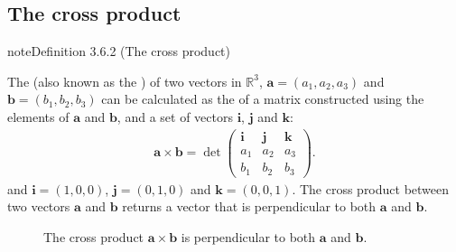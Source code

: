 \documentclass[letterpaper,10pt,english]{jupyterBook}
\let\sphinxpxdimen\pdfpxdimen\else\newdimen\sphinxpxdimen
\begin{document}
\subsection{The cross product}
\label{\detokenize{_pages/3.3_Dot_and_cross_products:the-cross-product}}\label{\detokenize{_pages/3.3_Dot_and_cross_products:index-3}}\label{\detokenize{_pages/3.3_Dot_and_cross_products:index-2}}\label{\detokenize{_pages/3.3_Dot_and_cross_products:cross-product-section}}\label{_pages/3.3_Dot_and_cross_products:cross-product-definition}
\begin{sphinxadmonition}{note}{Definition 3.6.2 (The cross product)}



\sphinxAtStartPar
The  (also known as the ) of two vectors in \(\mathbb{R}^3\), \(\mathbf{a}=(a_1,a_2,a_3)\) and \(\mathbf{b}=(b_1,b_2,b_3)\) can be calculated as the {\hyperref[\detokenize{_pages/1.4_Determinants:determinant-section}]{}} of a matrix constructed using the elements of \(\mathbf{a}\) and \(\mathbf{b}\), and a set of vectors \(\mathbf{i}\), \(\mathbf{j}\) and \(\mathbf{k}\):
\begin{equation}\label{equation:_pages/3.3_Dot_and_cross_products:cross-product-equation}
\begin{split}\mathbf{a} \times \mathbf{b} = \det 
\begin{pmatrix}
    \mathbf{i} & \mathbf{j} & \mathbf{k} \\
    a_1 & a_2 & a_3 \\
    b_1 & b_2 & b_3
\end{pmatrix}. \end{split}
\end{equation}
\sphinxAtStartPar
and \(\mathbf{i} = (1, 0, 0)\), \(\mathbf{j} = (0, 1, 0)\) and \(\mathbf{k} = (0, 0, 1)\). The cross product between two vectors \(\mathbf{a}\) and \(\mathbf{b}\) returns a vector that is perpendicular to both \(\mathbf{a}\) and \(\mathbf{b}\).

\begin{figure}[htbp]
\centering
\capstart

\noindent\sphinxincludegraphics[width=175\sphinxpxdimen]{{3_cross_product}.svg}
\caption{The cross product \(\mathbf{a} \times \mathbf{b}\) is perpendicular to both \(\mathbf{a}\) and \(\mathbf{b}\).}\label{\detokenize{_pages/3.3_Dot_and_cross_products:cross-product-figure}}\end{figure}
\end{sphinxadmonition}
\end{document}
